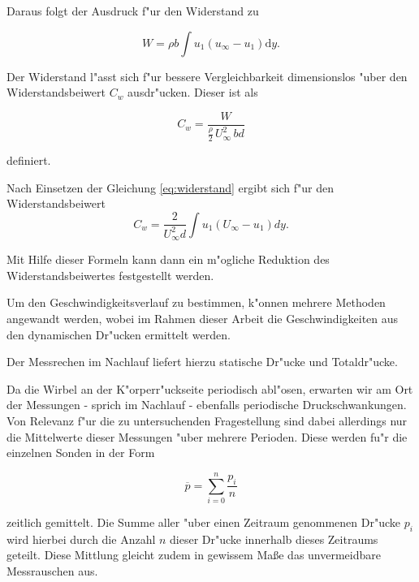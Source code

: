 Daraus folgt der Ausdruck f"ur den Widerstand zu
\begin{center}
	\begin{equation}
		\label{eq:widerstand}
		W = \rho b \int u_{1} (u_{\infty}- u_{1}) \mathrm{d}y.
	\end{equation}
\end{center}

Der Widerstand l"asst sich f"ur bessere Vergleichbarkeit dimensionslos "uber den Widerstandsbeiwert $C_w$ ausdr"ucken. Dieser ist als 
\begin{center}
	\begin{equation}
		\label{eq:def-c_w}
		C_w = \frac{W}{\frac{\rho}{2}\, U_{\infty}^2 \, bd}
	\end{equation}
\end{center}
definiert.

Nach Einsetzen der Gleichung \ref{eq:widerstand} ergibt sich f"ur den Widerstandsbeiwert
\begin{equation}
	\label{eq:Bestimmungsgleichung C_w}
	C_w = \frac{2}{U_{\infty}^2 d} \int u_{1}(U_{\infty} - u_{1}) dy.
\end{equation}

Mit Hilfe dieser Formeln kann dann ein m"ogliche Reduktion des Widerstandsbeiwertes festgestellt werden.

Um den Geschwindigkeitsverlauf zu bestimmen, k"onnen mehrere Methoden angewandt werden, wobei im Rahmen dieser Arbeit die Geschwindigkeiten aus den dynamischen Dr"ucken ermittelt werden.

Der Messrechen im Nachlauf liefert hierzu statische Dr"ucke und Totaldr"ucke.

Da die Wirbel an der K"orperr"uckseite periodisch abl"osen, erwarten wir am Ort der Messungen - sprich im Nachlauf - ebenfalls periodische Druckschwankungen.
Von Relevanz f"ur die zu untersuchenden Fragestellung sind dabei allerdings nur die Mittelwerte dieser Messungen "uber mehrere Perioden.
Diese werden fu"r die einzelnen Sonden in der Form
\begin{center}	
	\begin{equation}
		\overline{p}=\sum_{i=0}^{n}\frac{p_i}{n}
	\end{equation}
\end{center}
zeitlich gemittelt.
Die Summe aller "uber einen Zeitraum genommenen Dr"ucke $p_i$ wird hierbei durch die Anzahl $n$ dieser Dr"ucke innerhalb dieses Zeitraums geteilt.
Diese Mittlung gleicht zudem in gewissem Ma\ss{}e das unvermeidbare Messrauschen aus.

